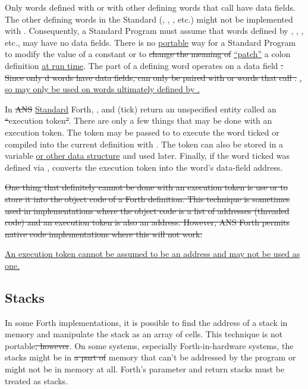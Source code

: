 Only words defined with  or with other defining words
that call  have data fields. The other defining words
in the Standard (, , \word{:}, etc.)
might not be implemented with . Consequently, a Standard
Program must assume that words defined by ,
, \word{:}, etc., may have no data fields. There is no
\uline{portable} way for a Standard Program to modify the value of a constant or to
\sout{change the meaning of} \uline{``patch''} a colon definition \uline{at run time}.
The  part of a defining word operates on a data field%
\sout{. Since only d words have data fields,  can
only be paired with  or words that call .}%
\uline{, so  may only be used on words ultimately defined by .}

In \sout{ANS} \uline{Standard} Forth, , \word{[']} and  (tick) return an
unspecified entity called an \sout{``}execution token\sout{''}. There are only a
few things that may be done with an execution token. The token may be
passed to  to execute the word ticked or compiled into
the current definition with . The token can also be
stored in a variable \uline{or other data structure} and used later.
Finally, if the word ticked was defined via , 
converts the execution token into the word's data-field address.

\sout{%
One thing that definitely cannot be done with an execution token is
use \word{!} or \word{,} to store it into the object code of a Forth
definition. This technique is sometimes used in implementations where
the object code is a list of addresses (threaded code) and an execution
token is also an address. However, ANS Forth permits native code
implementations where this will not work.}

\uline{%
An execution token cannot be assumed to be an address and may not
be used as one.}


\subsection{Stacks} %

In some Forth implementations, it is possible to find the address of
a stack in memory and manipulate the stack as an array of cells. This
technique is not portable\sout{, however}. On some systems, especially
Forth-in-hardware systems, the stacks might be in \sout{a part of} memory
that can't be addressed by the program or might not be in memory at
all. Forth's parameter and return stacks must be treated as stacks.

